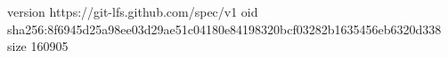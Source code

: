 version https://git-lfs.github.com/spec/v1
oid sha256:8f6945d25a98ee03d29ae51c04180e84198320bcf03282b1635456eb6320d338
size 160905
